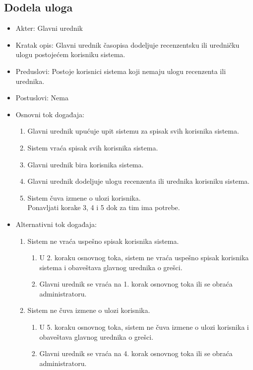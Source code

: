 \documentclass[a4paper]{article}
\begin{document}
\subsection{Dodela uloga}
\begin{itemize}
    \item Akter: Glavni urednik
    \item Kratak opis: Glavni urednik časopisa dodeljuje recenzentsku ili uredničku ulogu postojećem korisniku sistema.
    \item Preduslovi: Postoje korisnici sistema koji nemaju ulogu recenzenta ili urednika.
    \item Postuslovi: Nema
    \item Osnovni tok događaja:
        \begin{enumerate}
            \item Glavni urednik upućuje upit sistemu za spisak svih korisnika sistema.
            \item Sistem vraća spisak svih korisnika sistema.
            \item Glavni urednik bira korisnika sistema.
            \item Glavni urednik dodeljuje ulogu recenzenta ili urednika korisniku sistema.
            \item Sistem čuva izmene o ulozi korisnika.\\
            Ponavljati korake 3, 4 i 5 dok za tim ima potrebe.
        \end{enumerate}
    \item Alternativni tok događaja:
        \begin{enumerate}
            \item Sistem ne vraća uspešno spisak korisnika sistema.
            \begin{enumerate}
                \item U 2. koraku osnovnog toka, sistem ne vraća uspešno spisak korisnika sistema i obaveštava glavnog urednika o grešci.
                \item Glavni urednik se vraća na 1. korak osnovnog toka ili se obraća administratoru.
            \end{enumerate}
            \item Sistem ne čuva izmene o ulozi korisnika.
            \begin{enumerate}
                \item U 5. koraku osnovnog toka, sistem ne čuva izmene o ulozi korisnika i obaveštava glavnog urednika o grešci.
                \item Glavni urednik se vraća na 4. korak osnovnog toka ili se obraća administratoru.
            \end{enumerate}
        \end{enumerate}
\end{itemize}
\end{document}
